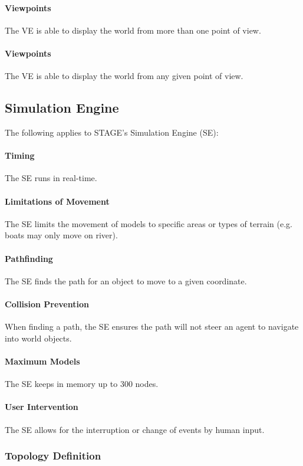 \documentclass[titlepage]{article}
\begin{document}
    \paragraph{Viewpoints} The VE is able to display the world from more than one point of view.
    \paragraph{Viewpoints} The VE is able to display the world from any given point of view.

\subsection{Simulation Engine}
The following applies to STAGE's Simulation Engine (SE):
    \paragraph{Timing} The SE runs in real-time.
    \paragraph{Limitations of Movement} The SE limits the movement of models to specific areas or types of terrain (e.g. boats may only move on river).
    \paragraph{Pathfinding} The SE finds the path for an object to move to a given coordinate.
    \paragraph{Collision Prevention} When finding a path, the SE ensures the path will not steer an agent to navigate into world objects.
    \paragraph{Maximum Models} The SE keeps in memory up to 300 nodes.
    \paragraph{User Intervention} The SE allows for the interruption or change of events by human input.

\subsubsection{Topology Definition}
\end{document}
